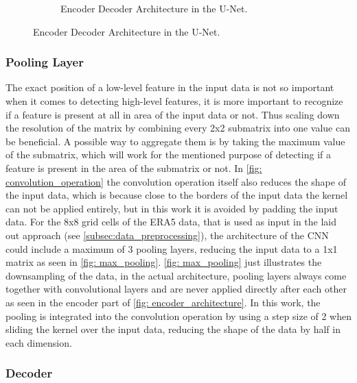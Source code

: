 \begin{figure}[H]
\begin{subfigure}{\textwidth}
        \caption{Encoder Decoder Architecture in the U-Net.}
        \label{fig: u_net}
    \end{subfigure}
\end{figure}

\subsubsection*{Pooling Layer}

The exact position of a low-level feature in the input data is not so important when it comes to detecting high-level features,
it is more important to recognize if a feature is present at all in area of the input data or not.
Thus scaling down the resolution of the matrix by combining every 2x2 submatrix into one value can be beneficial.
A possible way to aggregate them is by taking the maximum value of the submatrix, which will work for the mentioned purpose of detecting if a feature is present in the area of the submatrix or not. In \autoref{fig: convolution_operation} the convolution operation itself also reduces the shape of the input data, which is because close to the borders of the input data the kernel can not be applied entirely, but in this work it is avoided by padding the input data. For the 8x8 grid cells of the ERA5 data, that is used as input in the laid out approach (see \autoref{subsec:data_preprocessing}), the architecture of the CNN could include a maximum of 3 pooling layers, reducing the input data to a 1x1 matrix as seen in \autoref{fig: max_pooling}. \autoref{fig: max_pooling} just illustrates the downsampling of the data, in the actual architecture, pooling layers always come together with convolutional layers and are never applied directly after each other as seen in the encoder part of \autoref{fig: encoder_architecture}.
In this work, the pooling is integrated into the convolution operation by using a step size of 2 when sliding the kernel over the input data, reducing the shape of the data by half in each dimension.

\subsubsection*{Decoder}


